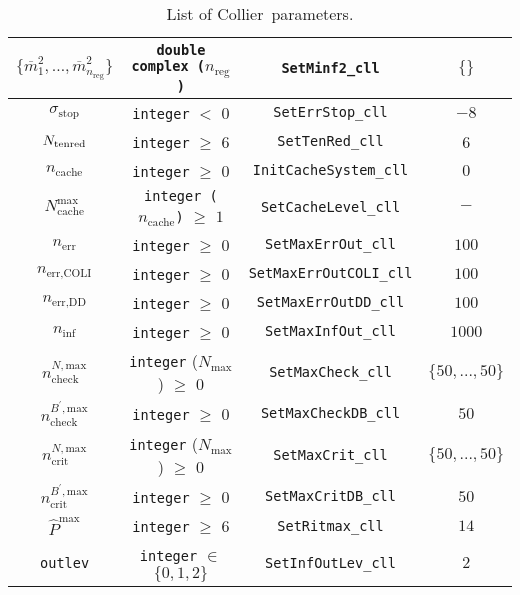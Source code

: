 \documentclass[preprint,sort&compress,12pt]{elsarticle}
\newcommand{\collier}{{\sc Collier}}
\begin{document}
\begin{table}
\begin{center}
\begin{tabular}{c|c|c|c}
\hline
$\{\overline{m}_{1}^2,\ldots,
\overline{m}_{n_{\textrm{reg}}}^2\}$ & {\tt double complex ($n_\textrm{reg}$)} & {\tt SetMinf2\_cll} %
            & $\{\}$ \\
\hline
$\sigma_\textrm{stop}$ & {\tt integer} $<$ $0$ & {\tt SetErrStop\_cll} %
           & $-8$ \\
\hline
$N_{\rm tenred}$ & {\tt integer} $\ge$ $6$ & {\tt SetTenRed\_cll} %
           & 6 \\
\hline
$n_\textrm{cache}$ & {\tt integer} $\ge$ $0$ & {\tt InitCacheSystem\_cll} %
           & $0$ \\
\hline
$N_{\textrm{cache}}^\textrm{max}$ & {\tt integer ($n_\textrm{cache}$)} $\ge$ $1$ & {\tt SetCacheLevel\_cll} 
           & $-$ \\           
\hline
$n_\textrm{err}$ & {\tt integer} $\ge$ $0$ & {\tt SetMaxErrOut\_cll} %
           & $100$ \\
\hline           
$n_\textrm{err,COLI}$ & {\tt integer} $\ge$ $0$ & {\tt SetMaxErrOutCOLI\_cll} %
           & $100$ \\
\hline
$n_\textrm{err,DD}$ & {\tt integer} $\ge$ $0$ & {\tt SetMaxErrOutDD\_cll} %
           & $100$ \\           
\hline
$n_\textrm{inf}$ & {\tt integer} $\ge$ $0$ & {\tt SetMaxInfOut\_cll} %
           & $1000$ \\           
\hline
$n^{N,\textrm{max}}_\textrm{check}$ & {\tt integer} ($N_\textrm{max}$) $\ge$ $0$ & {\tt SetMaxCheck\_cll} %
           & $\{50,...,50\}$ \\           
\hline
 $n^{B^\prime,\textrm{max}}_\textrm{check}$ & {\tt integer} $\ge$ $0$ & {\tt SetMaxCheckDB\_cll} %
           & $50$ \\           
\hline
$n^{N,\textrm{max}}_\textrm{crit}$ & {\tt integer} ($N_\textrm{max}$) $\ge$ $0$ & {\tt SetMaxCrit\_cll} %
           & $\{50,...,50\}$ \\           
\hline
 $n^{B^\prime,\textrm{max}}_\textrm{crit}$ & {\tt integer} $\ge$ $0$ & {\tt SetMaxCritDB\_cll} %
           & $50$ \\           
\hline
$\widehat{P}^\textrm{max}$ & {\tt integer} $\ge$ $6$ & {\tt SetRitmax\_cll} %
           & $14$ \\           
\hline
{\tt outlev} & {\tt integer}  $\in$ $\{0,1,2\}$  & {\tt SetInfOutLev\_cll} %
           & $2$ \\           
\hline
   \end{tabular}
\end{center}
  \caption{List of \collier\ parameters.}
  \label{tab:COLLIERparams}
\end{table}
\end{document}
